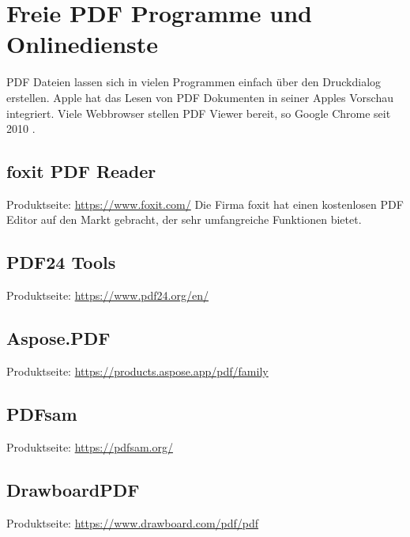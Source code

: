 \section{Freie PDF Programme und Onlinedienste}
PDF Dateien lassen sich in vielen Programmen einfach über den Druckdialog erstellen. Apple hat das Lesen von PDF Dokumenten in seiner Apples Vorschau integriert. Viele Webbrowser stellen PDF Viewer bereit, so Google Chrome seit 2010 \cite{wiki-pdf-de}.

\subsection{foxit PDF Reader}
Produktseite: \url{https://www.foxit.com/}
Die Firma foxit hat einen kostenlosen PDF Editor auf den Markt gebracht, der sehr umfangreiche Funktionen bietet.

\subsection{PDF24 Tools}
Produktseite: \url{https://www.pdf24.org/en/}

\subsection{Aspose.PDF}
Produktseite: \url{https://products.aspose.app/pdf/family}


\subsection{PDFsam}
Produktseite: \url{https://pdfsam.org/}

\subsection{DrawboardPDF}
Produktseite: \url{https://www.drawboard.com/pdf/pdf}

